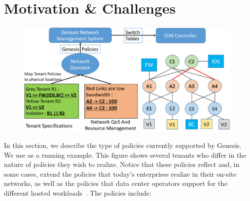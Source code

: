 \section{Motivation \& Challenges}
\begin{figure}
	\includegraphics[width=\columnwidth,center]{figures/architecture.eps}
	\label{fig:architecture}
\end{figure}
In this section, we describe the type of policies currently supported by
Genesis. %
We use  as a running example. This figure shows several
tenants who differ in the nature of policies they wish to realize. 
Notice that these policies reflect and, in some cases, extend the
policies that today's enterprises realize in their on-site networks, as
well as the policies that data center operators support for the different hosted
workloads~\cite{mpa-imc15}.  The policies include:





